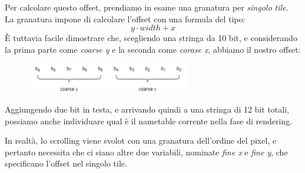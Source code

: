 \documentclass[11pt]{article}
\begin{document}
Per calcolare questo offset, prendiamo in esame una granatura per \emph{singolo tile}.\\
La granatura impone di calcolare l'offset con una formula del tipo:
\[
	y\cdot width+ x
\]
È tuttavia facile dimostrare che, scegliendo una stringa da 10 bit, e considerando la prima parte come \emph{coarse y} e la seconda come \emph{corase x}, abbiamo il nostro offset:
\begin{figure}[h]
\centering
\includegraphics[width=275px, height=50px]{OFFSET_CALC.png}
\end{figure}
Aggiungendo due bit in testa, e arrivando quindi a una stringa di 12 bit totali, possiamo anche individuare qual è il nametable corrente nella fase di rendering.

In realtà, lo scrolling viene svolot con una granatura dell'ordine del pixel, e pertanto necessita che ci siano altre due variabili, nominate \emph{fine x} e \emph{fine y}, che specificano l'offset nel singolo tile.
\end{document}
